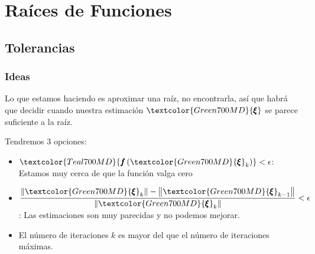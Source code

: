 \documentclass[12pt, fleqn]{report}                             %
\theoremstyle{break}                                            %
\newcommand{\Wrap}[1]           {\left( #1 \right)}             %
\newcommand{\Abs}[1]    {\left\lVert #1 \right\lVert}           %
\newcommand{\Color}[2]{\textcolor{#1}{#2}}                      %
\newcommand \ColorFun          {Teal700MD}                      %
\newcommand \ColorRoot         {Green700MD}                     %
\newcommand \Fun[1]      {\Color{\ColorFun}{\pmb{f}\Wrap{#1}}}          %
\newcommand \Root        {\Color{\ColorRoot}{\pmb{\xi} }}               %
\begin{document}
\tableofcontents{}
\label{sec:Index}

\clearpage



\part{Raíces de Funciones}
\clearpage

    \chapter{Tolerancias}

        \section{Ideas}

            Lo que estamos haciendo es aproximar una raíz, no encontrarla, así que habrá que decidir
            cuando nuestra estimación $\Root$ se parece suficiente a la raíz.

            Tendremos 3 opciones:
            \begin{itemize}
                \item $\Fun{\Root_k} < \epsilon$: Estamos muy cerca de que la función valga cero
                \item $\dfrac{ \Abs{\Root_k} - \Abs{\Root_{k-1}} }{\Abs{\Root_k}} < \epsilon$: Las
                    estimaciones son muy parecidas y no podemos mejorar.
                \item El número de iteraciones $k$ es mayor del que el número de iteraciones máximas.
            \end{itemize}
\end{document}
